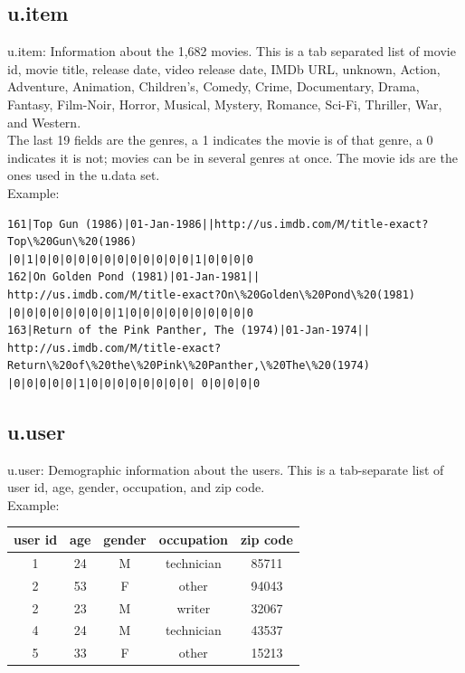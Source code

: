 \documentclass{article}
\begin{document}
\subsection*{u.item}

u.item: Information about the 1,682 movies. This is a tab separated list of movie id, movie title, release date, video release date, IMDb URL, unknown, Action, Adventure, Animation, Children's, Comedy, Crime, Documentary, Drama, Fantasy, Film-Noir, Horror, Musical, Mystery, Romance, Sci-Fi, Thriller, War, and Western. \\

The last 19 fields are the genres, a 1 indicates the movie is of that genre, a 0 indicates it is not; movies can be in several genres at once. The movie ids are the ones used in the u.data set. \\

Example: \\

\begin{verbatim}
161|Top Gun (1986)|01-Jan-1986||http://us.imdb.com/M/title-exact?Top\%20Gun\%20(1986)
|0|1|0|0|0|0|0|0|0|0|0|0|0|0|1|0|0|0|0 
162|On Golden Pond (1981)|01-Jan-1981||
http://us.imdb.com/M/title-exact?On\%20Golden\%20Pond\%20(1981)
|0|0|0|0|0|0|0|0|1|0|0|0|0|0|0|0|0|0|0 
163|Return of the Pink Panther, The (1974)|01-Jan-1974||
http://us.imdb.com/M/title-exact?Return\%20of\%20the\%20Pink\%20Panther,\%20The\%20(1974)
|0|0|0|0|0|1|0|0|0|0|0|0|0|0| 0|0|0|0|0
\end{verbatim}

\subsection*{u.user}

u.user: Demographic information about the users. This is a tab-separate list of user id, age, gender, occupation, and zip code. \\

Example: \\

\begin{table}[!h]
\centering
\begin{tabular}{c c c c c}
user id & age &  gender & occupation & zip code \\
\hline
1 & 24 & M & technician & 85711 \\
2 & 53 & F & other & 94043 \\
2 & 23 & M & writer & 32067 \\
4 & 24 & M & technician & 43537 \\
5 & 33 & F & other & 15213 \\
\end{tabular}
\end{table}
\end{document}
